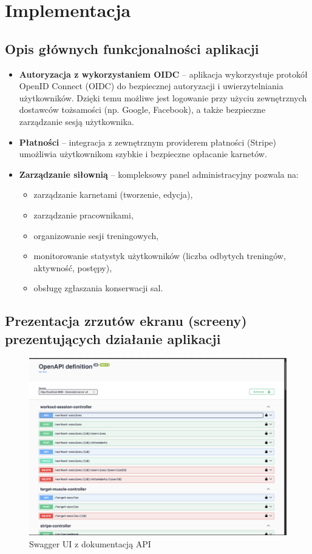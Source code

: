 \documentclass[../../spr.tex]{subfiles}
\begin{document}
\section{Implementacja}

\subsection{Opis głównych funkcjonalności aplikacji}

\begin{itemize}
  \item \textbf{Autoryzacja z wykorzystaniem OIDC} – aplikacja wykorzystuje protokół OpenID Connect (OIDC) do bezpiecznej autoryzacji i uwierzytelniania użytkowników. Dzięki temu możliwe jest logowanie przy użyciu zewnętrznych dostawców tożsamości (np. Google, Facebook), a także bezpieczne zarządzanie sesją użytkownika.

  \item \textbf{Płatności} – integracja z zewnętrznym providerem płatności  (Stripe) umożliwia użytkownikom szybkie i bezpieczne opłacanie karnetów.

  \item \textbf{Zarządzanie siłownią} – kompleksowy panel administracyjny pozwala na:
  \begin{itemize}
    \item zarządzanie karnetami (tworzenie, edycja),
    \item zarządzanie pracownikami,
    \item organizowanie sesji treningowych,
    \item monitorowanie statystyk użytkowników (liczba odbytych treningów, aktywność, postępy),
    \item obsługę zgłaszania konserwacji sal.
  \end{itemize}
\end{itemize}


\subsection{Prezentacja zrzutów ekranu (screeny) prezentujących działanie aplikacji}
\begin{figure}[H]
  \centering
  \includegraphics[width=\textwidth]{swagger.png}
  \caption{Swagger UI z dokumentacją API}
\end{figure}
\end{document}
